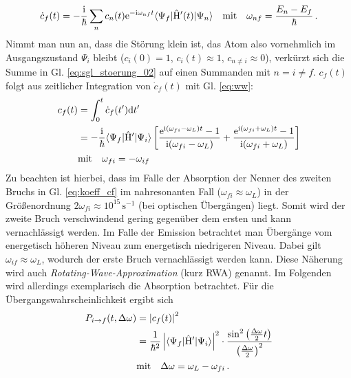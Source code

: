 \begin{equation}\label{eq:sgl_stoerung_02}
	\dot
	c_f(t)=-\frac{\mathrm{i}}{\hbar}\sum\limits_n{c_n(t)\mathrm{e}^{-\mathrm{i}\omega_{nf}t}\langle{\Psi_f}|\hat{\mathrm{H}}'(t)|{\Psi_n}\rangle}
	\quad\text{mit}\quad
	\omega_{nf}=\frac{E_n-E_f}{\hbar}\,.
\end{equation}
Nimmt man nun an, dass die Störung klein ist, das Atom also vornehmlich im
Ausgangszustand $\Psi_i$ bleibt ($c_i(0)=1$, $c_i(t)\approx 1$, $c_{n\neq
i}\approx0$), verkürzt sich die Summe in Gl. \eqref{eq:sgl_stoerung_02}
auf einen Summanden mit $n=i\neq f$. $c_f(t)$ folgt aus zeitlicher Integration von $\dot c_f(t)$ mit
Gl. \eqref{eq:ww}:
\begin{equation}\label{eq:koeff_cf}
	\begin{split}
		c_f(t) &= \int_0^t{\dot c_f(t')\mathrm{d} t'}\\
		&=
		-\frac{\mathrm{i}}{\hbar}\langle{\Psi_f}|\hat{\mathrm{H}}'|{\Psi_i}\rangle\left[\frac{\mathrm{e}^{\mathrm{i}(\omega_{fi}-\omega_L)t}-1}{\mathrm{i}(\omega_{fi}-\omega_L)}+\frac{\mathrm{e}^{\mathrm{i}(\omega_{fi}+\omega_L)t}-1}{\mathrm{i}(\omega_{fi}+\omega_L)}\right]\\
		&\text{mit}\quad
		\omega_{fi}=-\omega_{if}
	\end{split}
\end{equation}
Zu beachten ist hierbei, dass im Falle der Absorption der Nenner des zweiten
Bruchs in Gl. \eqref{eq:koeff_cf} im nahresonanten Fall
($\omega_{fi}\approx\omega_L$) in der Größenordnung $2\omega_{fi}\approx
10^{15}\,\text{s}^{-1}$ (bei optischen Übergängen) liegt. Somit wird der
zweite Bruch verschwindend gering gegenüber dem ersten und kann vernachlässigt
werden. Im Falle der Emission betrachtet man Übergänge vom energetisch höheren
Niveau zum energetisch niedrigeren Niveau. Dabei gilt
$\omega_{if}\approx\omega_L$, wodurch der erste Bruch vernachlässigt werden
kann. Diese Näherung wird auch \textit{Rotating-Wave-Approximation} (kurz RWA)
genannt. Im Folgenden wird allerdings exemplarisch die Absorption betrachtet.
Für die Übergangswahrscheinlichkeit ergibt sich
\begin{equation}\label{eq:uebergangs_wkt}
	\begin{split}
		P_{i\to f}(t,\Delta\omega) &= \left|c_f(t)\right|^2\\
		& =
		\frac{1}{\hbar^2}\left|\langle{\Psi_f}|\hat{\mathrm{H}}'|{\Psi_i}\rangle\right|^2\cdot\frac{\sin^2{\left(\frac{\Delta\omega}{2}t\right)}}{\left(\frac{\Delta\omega}{2}\right)^2}\\
		&\text{mit}\quad
		\Delta\omega=\omega_L-\omega_{fi}\,.
	\end{split}
\end{equation}
